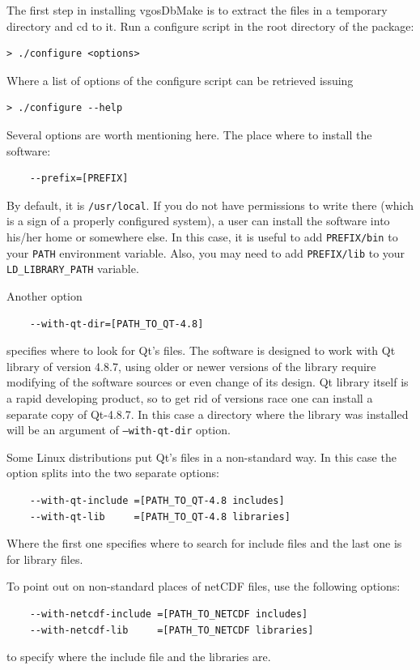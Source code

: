 \documentclass [10pt,letterpaper]{report}
\begin{document}
The first step in installing vgosDbMake is to extract the files in a
temporary directory and cd to it. Run a configure script in the root
directory of the package:
\begin{verbatim}
> ./configure <options>
\end{verbatim}
\noindent
Where a list of options of the configure script can be retrieved issuing

\begin{verbatim}
> ./configure --help
\end{verbatim}
\noindent
Several options are worth mentioning here. The place where to install
the software:
\begin{verbatim}
    --prefix=[PREFIX]
\end{verbatim}
\noindent
By default, it is {\tt /usr/local}. If you do not have permissions to
write there (which is a sign of a properly configured system), a user
can install the software into his/her home or somewhere else. In this
case, it is useful to add {\tt PREFIX/bin} to your {\tt PATH}
environment variable. Also, you may need to add {\tt PREFIX/lib} to your
{\tt LD\_LIBRARY\_PATH} variable.

Another option
\begin{verbatim}
    --with-qt-dir=[PATH_TO_QT-4.8]
\end{verbatim}
specifies where to look for Qt's files. The software is designed to work with
Qt library of version 4.8.7, using older or newer versions of the library
require modifying of the software sources or even change of its design.
Qt library itself is a rapid developing product, so to get rid of versions
race one can install a separate copy of Qt-4.8.7. In this case a directory
where the library was installed will be an argument of {\tt --with-qt-dir}
option.

Some Linux distributions put Qt's files in a non-standard way. In this case
the option splits into the two separate options:
\begin{verbatim}
    --with-qt-include =[PATH_TO_QT-4.8 includes]
    --with-qt-lib     =[PATH_TO_QT-4.8 libraries]
\end{verbatim}
Where the first one specifies where to search for include files and the last
one is for library files.

To point out on non-standard places of netCDF files, use the following options:
\begin{verbatim}
    --with-netcdf-include =[PATH_TO_NETCDF includes]
    --with-netcdf-lib     =[PATH_TO_NETCDF libraries]
\end{verbatim}
to specify where the include file and the libraries are.
\end{document}
